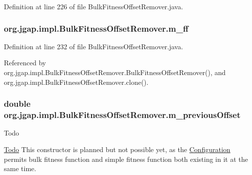 Definition at line 226 of file Bulk\-Fitness\-Offset\-Remover.\-java.

\hypertarget{classorg_1_1jgap_1_1impl_1_1_bulk_fitness_offset_remover_a146b2858f31e684e3bec61818a32f730}{
\subsubsection[{m\-\_\-ff}]{ org.\-jgap.\-impl.\-Bulk\-Fitness\-Offset\-Remover.\-m\-\_\-ff\hspace{0.3cm}{\ttfamily [private]}}}\label{classorg_1_1jgap_1_1impl_1_1_bulk_fitness_offset_remover_a146b2858f31e684e3bec61818a32f730}


Definition at line 232 of file Bulk\-Fitness\-Offset\-Remover.\-java.



Referenced by org.\-jgap.\-impl.\-Bulk\-Fitness\-Offset\-Remover.\-Bulk\-Fitness\-Offset\-Remover(), and org.\-jgap.\-impl.\-Bulk\-Fitness\-Offset\-Remover.\-clone().

\hypertarget{classorg_1_1jgap_1_1impl_1_1_bulk_fitness_offset_remover_a6741e29abe529b43b2e61d3301a1ce3c}{
\subsubsection[{m\-\_\-previous\-Offset}]{\setlength{\rightskip}{0pt plus 5cm}double org.\-jgap.\-impl.\-Bulk\-Fitness\-Offset\-Remover.\-m\-\_\-previous\-Offset\hspace{0.3cm}{\ttfamily [private]}}}\label{classorg_1_1jgap_1_1impl_1_1_bulk_fitness_offset_remover_a6741e29abe529b43b2e61d3301a1ce3c}
\begin{DoxyRefDesc}{Todo}
\item[\hyperlink{todo__todo000160}{Todo}]This constructor is planned but not possible yet, as the \hyperlink{classorg_1_1jgap_1_1_configuration}{Configuration} permits bulk fitness function and simple fitness function both existing in it at the same time. \end{DoxyRefDesc}


